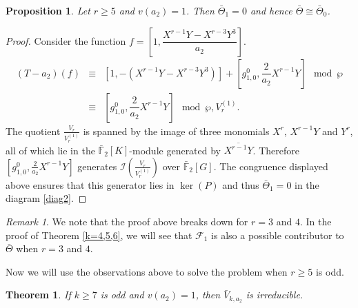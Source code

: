 \documentclass[11pt, reqno]{amsart}
\numberwithin{equation}{section}
\newcommand{\F}{\mathbb{F}}
\newtheorem{theorem}[thm]{Theorem}
\newtheorem{prop}[thm]{Proposition}
\theoremstyle{definition}
\theoremstyle{remark}
\newtheorem{remark}[thm]{Remark}
\theoremstyle{definition}
\theoremstyle{remark}
\theoremstyle{remark}
\begin{document}
\begin{prop}\label{theta1}
    Let $r\geq 5 $ and $v(a_{2})=1$. Then $\bar{\Theta}_{1}=0$ and hence $\bar{\Theta} \cong \bar{\Theta}_{0}$.
\end{prop}
\begin{proof}
    Consider the function $f=\left[1, \dfrac{X^{r-1}Y-X^{r-3}Y^{3}}{a_{2}}\right]$. 
 \begin{eqnarray*}
  (T-a_{2})(f) &\equiv& \left[1, -(X^{r-1}Y - X^{r-3}Y^{3})\right] + \left[g_{1,0}^{0}, \dfrac{2}{a_{2}}X^{r-1}Y\right] \mod \wp\\
  &\equiv& \left[g_{1,0}^{0}, \dfrac{2}{a_{2}}X^{r-1}Y\right] \mod\wp, V_{r}^{(1)}.
  \end{eqnarray*}The quotient $\frac{V_{r}}{V_{r}^{(1)}}$ is spanned by the image of three monomials $X^r$, $X^{r-1}Y$ and $Y^r$, all of which lie in the $\bar{\F}_{2}[K]$-module generated by $\overline{X^{r-1}Y}$. Therefore $\left[g_{1,0}^{0}, \frac{2}{a_{2}}X^{r-1}Y\right]$ generates $\mathcal{I}\left(\frac{V_{r}}{V_{r}^{(1)}}\right)$ over $\bar{\F}_{2}[G]$. The congruence displayed above ensures that this generator lies in $\ker(P)$ and thus $\bar{\Theta}_{1}=0$ in the diagram \eqref{diag2}. \end{proof}
\begin{remark}
    We note that the proof above breaks down for $r=3$ and $4$. In the proof of Theorem \ref{k=4,5,6}, we will see that $\mathcal{F}_{1}$ is also a possible contributor to $\bar{\Theta}$ when $r=3$ and $4$.
\end{remark}
Now we will use the observations above to solve the problem when $r\geq 5$ is odd.
\begin{theorem}\label{oddthm}
If $k\geq 7$ is odd and $v(a_2)=1$, then $\bar V_{k,a_2}$ is irreducible.
    \end{theorem}
\end{document}

